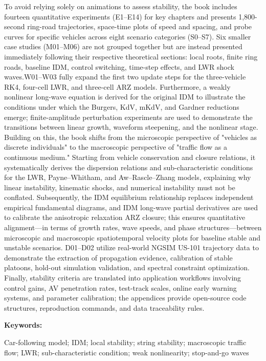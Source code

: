 \documentclass[11pt,a4paper,openany]{book}
\numberwithin{equation}{chapter}
\numberwithin{figure}{chapter}
\numberwithin{table}{chapter}
\begin{document}
To avoid relying solely on animations to assess stability, the book includes fourteen quantitative experiments (E1–E14) for key chapters and presents 1,800-second ring-road trajectories, space-time plots of speed and spacing, and probe curves for specific vehicles across eight scenario categories (S0–S7). Six smaller case studies (M01–M06) are not grouped together but are instead presented immediately following their respective theoretical sections: local roots, finite ring roads, baseline IDM, control switching, time-step effects, and LWR shock waves.W01–W03 fully expand the first two update steps for the three-vehicle RK4, four-cell LWR, and three-cell ARZ models. Furthermore, a weakly nonlinear long-wave equation is derived for the original IDM to illustrate the conditions under which the Burgers, KdV, mKdV, and Gardner reductions emerge; finite-amplitude perturbation experiments are used to demonstrate the transitions between linear growth, waveform steepening, and the nonlinear stage. Building on this, the book shifts from the microscopic perspective of "vehicles as discrete individuals" to the macroscopic perspective of "traffic flow as a continuous medium." Starting from vehicle conservation and closure relations, it systematically derives the dispersion relations and sub-characteristic conditions for the LWR, Payne–Whitham, and Aw–Rascle–Zhang models, explaining why linear instability, kinematic shocks, and numerical instability must not be conflated. Subsequently, the IDM equilibrium relationship replaces independent empirical fundamental diagrams, and IDM long-wave partial derivatives are used to calibrate the anisotropic relaxation ARZ closure; this ensures quantitative alignment—in terms of growth rates, wave speeds, and phase structures—between microscopic and macroscopic spatiotemporal velocity plots for baseline stable and unstable scenarios. D01–D02 utilize real-world NGSIM US-101 trajectory data to demonstrate the extraction of propagation evidence, calibration of stable platoons, hold-out simulation validation, and spectral constraint optimization. Finally, stability criteria are translated into application workflows involving control gains, AV penetration rates, test-track scales, online early warning systems, and parameter calibration; the appendices provide open-source code structures, reproduction commands, and data traceability rules.

\vspace{0.8em}
\noindent\textbf{Keywords:}

Car-following model; IDM; local stability; string stability; macroscopic traffic flow; LWR; sub-characteristic condition; weak nonlinearity; stop-and-go waves
\end{document}
